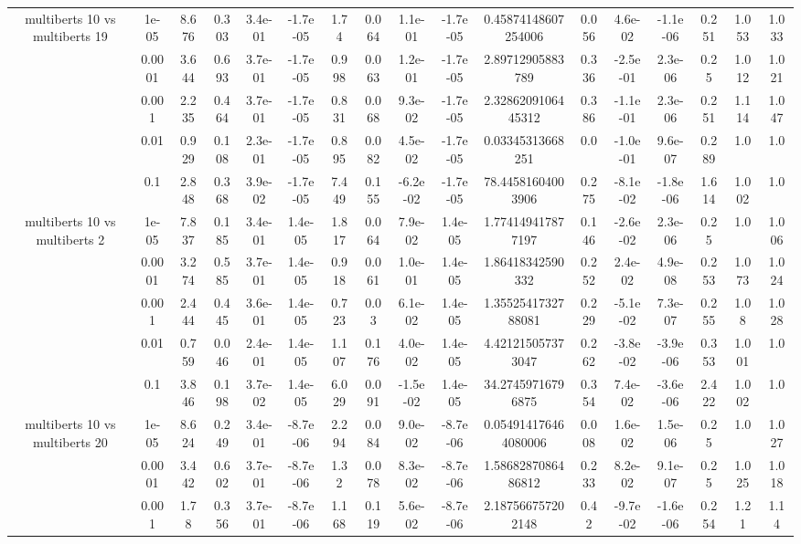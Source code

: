\begin{tabular}{|c|c|c|c|c|c|c|c|c|c|c|c|c|c|c|c|c|}
\hline
\multirow{5}{*}{multiberts 10 vs multiberts 19} & 1e-05 & 8.676 & 0.303 & 3.4e-01 & -1.7e-05 & 1.74 & 0.064 & 1.1e-01 & -1.7e-05 & 0.45874148607254006 & 0.056 & 4.6e-02 & -1.1e-06 & 0.251 & 1.053 & 1.033 \\
 & 0.0001 & 3.644 & 0.693 & 3.7e-01 & -1.7e-05 & 0.998 & 0.063 & 1.2e-01 & -1.7e-05 & 2.89712905883789 & 0.336 & -2.5e-01 & 2.3e-06 & 0.25 & 1.012 & 1.021 \\
 & 0.001 & 2.235 & 0.464 & 3.7e-01 & -1.7e-05 & 0.831 & 0.068 & 9.3e-02 & -1.7e-05 & 2.3286209106445312 & 0.386 & -1.1e-01 & 2.3e-06 & 0.251 & 1.114 & 1.047 \\
 & 0.01 & 0.929 & 0.108 & 2.3e-01 & -1.7e-05 & 0.895 & 0.082 & 4.5e-02 & -1.7e-05 & 0.03345313668251 & 0.0 & -1.0e-01 & 9.6e-07 & 0.289 & 1.0 & 1.0 \\
 & 0.1 & 2.848 & 0.368 & 3.9e-02 & -1.7e-05 & 7.449 & 0.155 & -6.2e-02 & -1.7e-05 & 78.44581604003906 & 0.275 & -8.1e-02 & -1.8e-06 & 1.614 & 1.002 & 1.0 \\
\hline
\multirow{5}{*}{multiberts 10 vs multiberts 2} & 1e-05 & 7.837 & 0.185 & 3.4e-01 & 1.4e-05 & 1.817 & 0.064 & 7.9e-02 & 1.4e-05 & 1.774149417877197 & 0.146 & -2.6e-02 & 2.3e-06 & 0.25 & 1.0 & 1.006 \\
 & 0.0001 & 3.274 & 0.585 & 3.7e-01 & 1.4e-05 & 0.918 & 0.061 & 1.0e-01 & 1.4e-05 & 1.86418342590332 & 0.252 & 2.4e-02 & 4.9e-08 & 0.253 & 1.073 & 1.024 \\
 & 0.001 & 2.444 & 0.445 & 3.6e-01 & 1.4e-05 & 0.723 & 0.03 & 6.1e-02 & 1.4e-05 & 1.3552541732788081 & 0.229 & -5.1e-02 & 7.3e-07 & 0.255 & 1.08 & 1.028 \\
 & 0.01 & 0.759 & 0.046 & 2.4e-01 & 1.4e-05 & 1.107 & 0.176 & 4.0e-02 & 1.4e-05 & 4.421215057373047 & 0.262 & -3.8e-02 & -3.9e-06 & 0.353 & 1.001 & 1.0 \\
 & 0.1 & 3.846 & 0.198 & 3.7e-02 & 1.4e-05 & 6.029 & 0.091 & -1.5e-02 & 1.4e-05 & 34.27459716796875 & 0.354 & 7.4e-02 & -3.6e-06 & 2.422 & 1.002 & 1.0 \\
\hline
\multirow{5}{*}{multiberts 10 vs multiberts 20} & 1e-05 & 8.624 & 0.249 & 3.4e-01 & -8.7e-06 & 2.294 & 0.084 & 9.0e-02 & -8.7e-06 & 0.054914176464080006 & 0.008 & 1.6e-02 & 1.5e-06 & 0.25 & 1.0 & 1.027 \\
 & 0.0001 & 3.442 & 0.602 & 3.7e-01 & -8.7e-06 & 1.32 & 0.078 & 8.3e-02 & -8.7e-06 & 1.5868287086486812 & 0.233 & 8.2e-02 & 9.1e-07 & 0.25 & 1.025 & 1.018 \\
 & 0.001 & 1.78 & 0.356 & 3.7e-01 & -8.7e-06 & 1.168 & 0.119 & 5.6e-02 & -8.7e-06 & 2.187566757202148 & 0.42 & -9.7e-02 & -1.6e-06 & 0.254 & 1.21 & 1.14 \\

\end{tabular}
